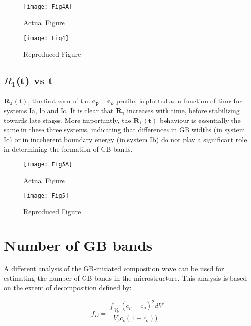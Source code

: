 \begin{figure}[H]
\texttt{[image: Fig4A]}
\caption{Actual Figure}
\end{figure}

\begin{figure}[H]
\texttt{[image: Fig4]}
\caption{Reproduced Figure}
\end{figure}

\subsection{$R_1$(t) vs t}

$\mathbold{R_1(t)}$, the first zero of the $\mathbold{c_p-c_o}$ profile, is plotted as a function of time for systems Ia, lb and Ic. It is clear that $\mathbold{R_1}$ increases with time, before stabilizing towards late stages. More importantly, the $\mathbold{R_1(t)}$ behaviour is essentially the same in these three systems, indicating that differences in GB widths (in system Ic) or in incoherent boundary energy (in system Ib) do not play a significant role in determining the formation of GB-bands.

\begin{figure}[H]
\texttt{[image: Fig5A]}
\caption{Actual Figure}
\end{figure}

\begin{figure}[H]
\texttt{[image: Fig5]}
\caption{Reproduced Figure}
\end{figure}

\section{Number of GB bands}
A different analysis of the GB-initiated composition wave can be used for estimating the number of GB bands in the microstructure. This analysis is based on the extent of decomposition defined by:

\begin{equation}
f_D=\frac{\int_{V_b} (c_p-c_o)^2 dV}{V_b c_o (1-c_o))} 
\end{equation}

